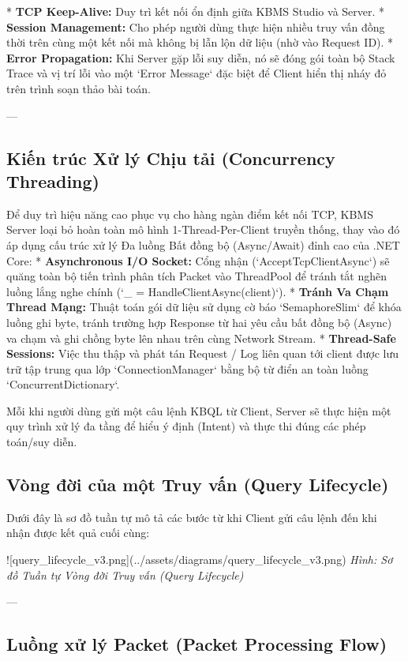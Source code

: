 *   \textbf{TCP Keep-Alive:} Duy trì kết nối ổn định giữa KBMS Studio và Server.
*   \textbf{Session Management:} Cho phép người dùng thực hiện nhiều truy vấn đồng thời trên cùng một kết nối mà không bị lẫn lộn dữ liệu (nhờ vào Request ID).
*   \textbf{Error Propagation:} Khi Server gặp lỗi suy diễn, nó sẽ đóng gói toàn bộ Stack Trace và vị trí lỗi vào một `Error Message` đặc biệt để Client hiển thị nháy đỏ trên trình soạn thảo bài toán.

---

\subsection{Kiến trúc Xử lý Chịu tải (Concurrency Threading)}

Để duy trì hiệu năng cao phục vụ cho hàng ngàn điểm kết nối TCP, KBMS Server loại bỏ hoàn toàn mô hình 1-Thread-Per-Client truyền thống, thay vào đó áp dụng cấu trúc xử lý Đa luồng Bất đồng bộ (Async/Await) đỉnh cao của .NET Core:
*   \textbf{Asynchronous I/O Socket:} Cổng nhận (`AcceptTcpClientAsync`) sẽ quăng toàn bộ tiến trình phân tích Packet vào ThreadPool để tránh tắt nghẽn luồng lắng nghe chính (`\_ = HandleClientAsync(client)`).
*   \textbf{Tránh Va Chạm Thread Mạng:} Thuật toán gói dữ liệu sử dụng cờ báo `SemaphoreSlim` để khóa luồng ghi byte, tránh trường hợp Response từ hai yêu cầu bất đồng bộ (Async) va chạm và ghi chồng byte lên nhau trên cùng Network Stream.
*   \textbf{Thread-Safe Sessions:} Việc thu thập và phát tán Request / Log liên quan tới client được lưu trữ tập trung qua lớp `ConnectionManager` bằng bộ từ điển an toàn luồng `ConcurrentDictionary`.

Mỗi khi người dùng gửi một câu lệnh KBQL từ Client, Server sẽ thực hiện một quy trình xử lý đa tầng để hiểu ý định (Intent) và thực thi đúng các phép toán/suy diễn.

\subsection{Vòng đời của một Truy vấn (Query Lifecycle)}

Dưới đây là sơ đồ tuần tự mô tả các bước từ khi Client gửi câu lệnh đến khi nhận được kết quả cuối cùng:

![query\_lifecycle\_v3.png](../assets/diagrams/query\_lifecycle\_v3.png)
\textit{Hình: Sơ đồ Tuần tự Vòng đời Truy vấn (Query Lifecycle)}

---

\subsection{Luồng xử lý Packet (Packet Processing Flow)}

